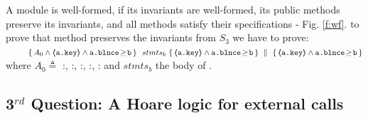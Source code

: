 A module is well-formed, if  its invariants are well-formed,    its public methods preserve   its invariants, and  all  methods satisfy their specifications - \cf  Fig.  \ref{f:wf}.
%
%
%
%
%
%
%
%
\Eg to prove  that method  preserves the invariants from {$S_3$}  we  have to prove:
\\
{ \footnotesize{
$\strut \ \ \ \ \ \   \ \   \quadruple {A_0  \wedge  \inside{\prg{a.\password}} \wedge  \prg{a.\balance}\!\geq\!{\prg{b}} } {\  stmts_{b}  \  } {\inside{\prg{a.\password}} \wedge  \prg{a.\balance}\!\geq\!{\prg{b}}}  
   { \inside{\prg{a.\password}}\wedge  \prg{a.\balance}\!\geq\!{\prg{b} }}$
}}
\\
where $A_0 \triangleq $  {\footnotesize{
:, :, :, :$
$, :}} and $stmts_{b}$ %
the    body of .
 


 
 \vspace{.1cm}
 
   \subsection{3$^{rd}$ Question:  A Hoare logic for external calls}  
 \label{sec:howThird}
 
